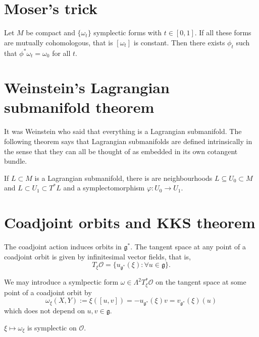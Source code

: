 \section{Moser's trick}
\label{section-moser-trick}

\begin{theorem}
\label{theorem-moser-trick}
Let $M$ be compact and $\{\omega_t\}$ symplectic forms with $t \in [0,1]$.
If all these forms are mutually cohomologous, that is $[\omega_t]$
is constant. Then there exists $\phi_t$ such that
$\phi^*\omega_t=\omega_0$ for all $t$.
\end{theorem}

\section{Weinstein's Lagrangian submanifold theorem}
\label{section-weinstein-lagrangian-submanifold}

\noindent
It was Weinstein who said that everything is a Lagrangian submanifold.
The following theorem says that Lagrangian submanifolds are
defined intrinsically in the sense that they can all
be thought of as embedded in its own cotangent bundle.

\begin{theorem}
\label{theorem-weinstein-lagrangian-submanifold}
If $L \subset M$ is a Lagrangian submanifold,
there is are neighbourhoods $L \subseteq U_0 \subset M$
and $L \subset U_1 \subset T^*L$
and a symplectomorphism $\varphi:U_0 \to U_1$. 
\end{theorem}

\section{Coadjoint orbits and KKS theorem}
\label{section-coadjoint-orbits}

\noindent
The coadjoint action induces orbits in $\mathfrak{g}^*$.
The tangent space at any point of a
coadjoint orbit is given by infinitesimal vector
fields, that is,
$$
T_{\xi}\mathcal{O}=\{u_{\mathfrak{g}^*}(\xi):\forall u \in \mathfrak{g}\}.
$$

\noindent
We may introduce a symlpectic form
$\omega \in \Lambda^{2}T^*_\xi\mathcal{O}$
on the tangent space 
at some point of a
coadjoint orbit by
$$
\omega_\xi(X,Y):=\xi([u,v])=-u_{\mathfrak{g}^*}(\xi)v=v_{\mathfrak{g}^*}(\xi)(u)
$$
which does not depend on $u,v \in \mathfrak{g}$.

\begin{theorem}[KKS]
\label{theorem-KKS}
$\xi \mapsto  \omega_\xi$ is symplectic on $\mathcal{O}$.
\end{theorem}


